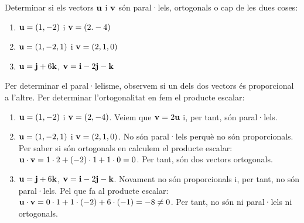 \Exercise Determinar si els vectors $\textbf{u}$ i $\textbf{v}$ són paral·lels, ortogonals o cap de les dues coses:

\begin{enumerate}
  \item $\textbf{u}=(1,-2)$ i $\textbf{v}=(2.-4)$
  \item $\textbf{u}=(1,-2,1)$ i $\textbf{v}=(2,1,0)$
  \item $\textbf{u}=\textbf{j}+6\textbf{k}$, $\textbf{v}=\textbf{i}-2\textbf{j}-\textbf{k}$
\end{enumerate}

\Answer Per determinar el paral·lelisme, observem si un dels dos vectors és proporcional a l'altre. Per determinar l'ortogonalitat en fem el producte escalar:

\begin{enumerate}
  \item $\textbf{u}=(1,-2)$ i $\textbf{v}=(2,-4)$. Veiem que $\textbf{v}=2\textbf{u}$ i, per tant, són paral·lels.
  \item $\textbf{u}=(1,-2,1)$ i $\textbf{v}=(2,1,0)$. No són paral·lels perquè no són proporcionals. Per saber si són ortogonals en calculem el producte escalar: $\textbf{u}\cdot\textbf{v}=1\cdot2+(-2)\cdot1+1\cdot0=0$. Per tant, són dos vectors ortogonals.
  \item $\textbf{u}=\textbf{j}+6\textbf{k}$, $\textbf{v}=\textbf{i}-2\textbf{j}-\textbf{k}$. Novament no són proporcionals i, per tant, no són paral·lels. Pel que fa al producte escalar: $\textbf{u}\cdot\textbf{v}=0\cdot1+1\cdot(-2)+6\cdot(-1)=-8\neq0$. Per tant, no són ni paral·lels ni ortogonals.
\end{enumerate}
\blacksquare
